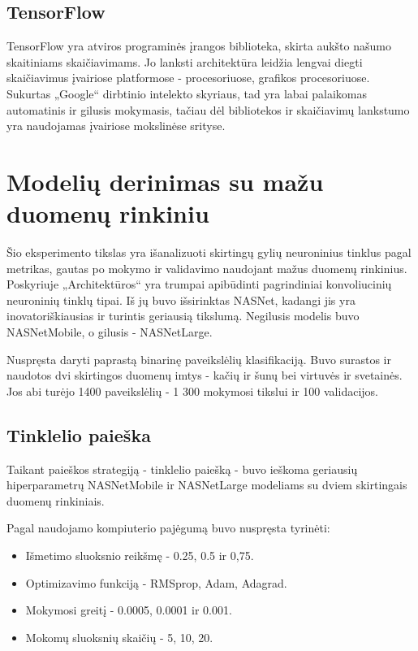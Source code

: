 \documentclass{VUMIFPSbakalaurinis}
\begin{document}
\subsection{TensorFlow}
TensorFlow yra atviros programinės įrangos biblioteka, skirta aukšto našumo skaitiniams skaičiavimams. Jo lanksti architektūra leidžia lengvai diegti skaičiavimus įvairiose 
platformose - procesoriuose, grafikos procesoriuose. Sukurtas „Google“ dirbtinio intelekto skyriaus, tad yra labai palaikomas automatinis ir gilusis mokymasis, tačiau 
dėl bibliotekos ir skaičiavimų lankstumo yra naudojamas įvairiose mokslinėse srityse.

\section{Modelių derinimas su mažu duomenų rinkiniu} 
Šio eksperimento tikslas yra išanalizuoti skirtingų gylių neuroninius tinklus pagal metrikas, gautas po mokymo ir validavimo naudojant mažus duomenų rinkinius. 
Poskyriuje „Architektūros“ yra trumpai apibūdinti pagrindiniai konvoliucinių neuroninių tinklų tipai. 
Iš jų buvo išsirinktas NASNet, kadangi jis yra inovatoriškiausias ir turintis geriausią tikslumą. Negilusis modelis buvo NASNetMobile, o gilusis - NASNetLarge.

Nuspręsta daryti paprastą binarinę paveikslėlių klasifikaciją.
Buvo surastos ir naudotos dvi skirtingos duomenų imtys - kačių ir šunų bei virtuvės ir svetainės. Jos abi turėjo 1400 paveikslėlių - 1 300 mokymosi tikslui ir 100 validacijos.

\subsection{Tinklelio paieška}

Taikant paieškos strategiją - tinklelio paiešką - buvo ieškoma geriausių hiperparametrų NASNetMobile ir NASNetLarge modeliams su dviem skirtingais duomenų rinkiniais.

Pagal naudojamo kompiuterio pajėgumą buvo nuspręsta tyrinėti:
\begin{itemize}
    \item Išmetimo sluoksnio reikšmę - 0.25, 0.5 ir 0,75.
    \item Optimizavimo funkciją - RMSprop, Adam, Adagrad.
    \item Mokymosi greitį - 0.0005, 0.0001 ir 0.001.
    \item Mokomų sluoksnių skaičių - 5, 10, 20.
\end{itemize}
\end{document}
